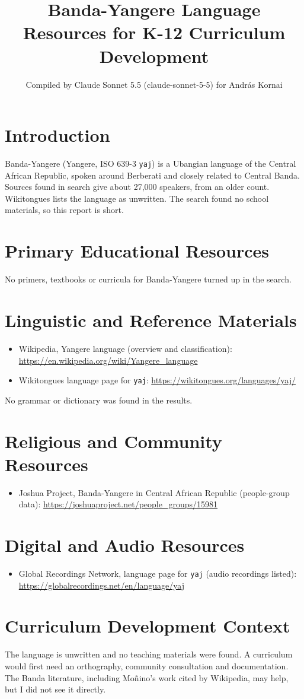 \documentclass[12pt]{article}
\title{Banda-Yangere Language Resources for K-12 Curriculum Development}
\author{Compiled by Claude Sonnet 5.5 (claude-sonnet-5-5) for Andr\'as Kornai}
\date{}
\begin{document}
\maketitle

\section{Introduction}
Banda-Yangere (Yangere, ISO 639-3 \texttt{yaj}) is a Ubangian language of the Central African Republic, spoken around Berberati and closely related to Central Banda. Sources found in search give about 27,000 speakers, from an older count. Wikitongues lists the language as unwritten. The search found no school materials, so this report is short.

\section{Primary Educational Resources}
No primers, textbooks or curricula for Banda-Yangere turned up in the search.

\section{Linguistic and Reference Materials}
\begin{itemize}
\item Wikipedia, Yangere language (overview and classification): \url{https://en.wikipedia.org/wiki/Yangere_language}
\item Wikitongues language page for \texttt{yaj}: \url{https://wikitongues.org/languages/yaj/}
\end{itemize}
No grammar or dictionary was found in the results.

\section{Religious and Community Resources}
\begin{itemize}
\item Joshua Project, Banda-Yangere in Central African Republic (people-group data): \url{https://joshuaproject.net/people_groups/15981}
\end{itemize}

\section{Digital and Audio Resources}
\begin{itemize}
\item Global Recordings Network, language page for \texttt{yaj} (audio recordings listed): \url{https://globalrecordings.net/en/language/yaj}
\end{itemize}

\section{Curriculum Development Context}
The language is unwritten and no teaching materials were found. A curriculum would first need an orthography, community consultation and documentation. The Banda literature, including Moñino's work cited by Wikipedia, may help, but I did not see it directly.
\end{document}
